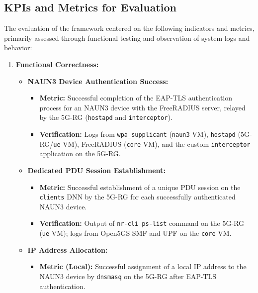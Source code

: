\subsection{\acs{KPI}s and Metrics for Evaluation}

The evaluation of the framework centered on the following indicators and metrics, primarily assessed through functional testing and observation of system logs and behavior:

\begin{enumerate}
    \item{
        \textbf{Functional Correctness:}
        \begin{itemize}
            \item {
                \textbf{\ac{NAUN3} Device Authentication Success:}
                \begin{itemize}
                    \item \textbf{Metric:} Successful completion of the \ac{EAP-TLS} authentication process for an \ac{NAUN3} device with the FreeRADIUS server, relayed by the \ac{5G-RG} (\texttt{hostapd} and \texttt{interceptor}).

                    \item \textbf{Verification:} Logs from \texttt{wpa\_supplicant} (\texttt{naun3} \ac{VM}), \texttt{hostapd} (\ac{5G-RG}/\texttt{ue} \ac{VM}), FreeRADIUS (\texttt{core} \ac{VM}), and the custom \texttt{interceptor} application on the \ac{5G-RG}. 
                \end{itemize}
            }
            \item {
                \textbf{Dedicated \ac{PDU} Session Establishment:}
                \begin{itemize}
                    \item \textbf{Metric:} Successful establishment of a unique \ac{PDU} session on the \texttt{clients} \ac{DNN} by the \ac{5G-RG} for each successfully authenticated \ac{NAUN3} device.

                    \item \textbf{Verification:} Output of \texttt{nr-cli ps-list} command on the \ac{5G-RG} (\texttt{ue} \ac{VM}); logs from Open5GS \ac{SMF} and \ac{UPF} on the \texttt{core} \ac{VM}. 
                \end{itemize}
            }
            \item {
                \textbf{\ac{IP} Address Allocation:}
                \begin{itemize}
                    \item \textbf{Metric (Local):} Successful assignment of a local \ac{IP} address to the \ac{NAUN3} device by \texttt{dnsmasq} on the \ac{5G-RG} after \ac{EAP-TLS} authentication.


\end{itemize}}
\end{itemize}}
\end{enumerate}
